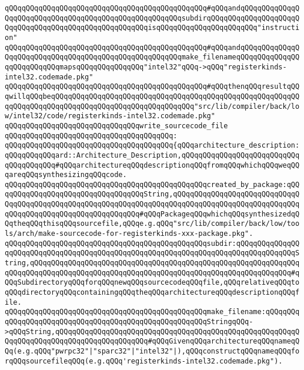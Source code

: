 \verb|qQQqqQQqqQQqqQQqqQQqqQQqqQQqqQQqqQQqqQQqqQQqqQQq#qQQqandqQQqqQQqqQQqqQQqqQQqqQQqqQQqqQQqqQQqqQQqqQQqqQQqqQQqqQQqsubdirqQQqqQQqqQQqqQQqqQQqqQQqqQQqqQQqqQQqqQQqqQQqqQQqqQQqqQQqisqQQqqQQqqQQqqQQqqQQqqQQq"instruction"|\newline
\verb|qQQqqQQqqQQqqQQqqQQqqQQqqQQqqQQqqQQqqQQqqQQqqQQq#qQQqandqQQqqQQqqQQqqQQqqQQqqQQqqQQqqQQqqQQqqQQqqQQqqQQqqQQqqQQqmake_filenameqQQqqQQqqQQqqQQqqQQqqQQqqQQqmapsqQQqqQQqqQQqqQQq"intel32"qQQq->qQQq"registerkinds-intel32.codemade.pkg"|\newline
\verb|qQQqqQQqqQQqqQQqqQQqqQQqqQQqqQQqqQQqqQQqqQQqqQQq#qQQqthenqQQqresultqQQqwillqQQqbeqQQqqQQqqQQqqQQqqQQqqQQqqQQqqQQqqQQqqQQqqQQqqQQqqQQqqQQqqQQqqQQqqQQqqQQqqQQqqQQqqQQqqQQqqQQqqQQqqQQqqQQq"src/lib/compiler/back/low/intel32/code/registerkinds-intel32.codemade.pkg"|\newline
\newline
\verb|qQQqqQQqqQQqqQQqqQQqqQQqqQQqqQQqwrite_sourcecode_file|\newline
\verb|qQQqqQQqqQQqqQQqqQQqqQQqqQQqqQQqqQQqqQQq:|\newline
\verb|qQQqqQQqqQQqqQQqqQQqqQQqqQQqqQQqqQQqqQQq{qQQqarchitecture_description:qQQqqQQqqQQqard::Architecture_Description,qQQqqQQqqQQqqQQqqQQqqQQqqQQqqQQqqQQqqQQq#qQQqarchitectureqQQqdescriptionqQQqfromqQQqwhichqQQqweqQQqareqQQqsynthesizingqQQqcode.|\newline
\verb|qQQqqQQqqQQqqQQqqQQqqQQqqQQqqQQqqQQqqQQqqQQqqQQqcreated_by_package:qQQqqQQqqQQqqQQqqQQqqQQqqQQqqQQqqQQqString,qQQqqQQqqQQqqQQqqQQqqQQqqQQqqQQqqQQqqQQqqQQqqQQqqQQqqQQqqQQqqQQqqQQqqQQqqQQqqQQqqQQqqQQqqQQqqQQqqQQqqQQqqQQqqQQqqQQqqQQqqQQqqQQqqQQq#qQQqPackageqQQqwhichqQQqsynthesizedqQQqtheqQQqthisqQQqsourcefile,qQQqe.g.qQQq"src/lib/compiler/back/low/tools/arch/make-sourcecode-for-registerkinds-xxx-package.pkg".|\newline
\verb|qQQqqQQqqQQqqQQqqQQqqQQqqQQqqQQqqQQqqQQqqQQqqQQqsubdir:qQQqqQQqqQQqqQQqqQQqqQQqqQQqqQQqqQQqqQQqqQQqqQQqqQQqqQQqqQQqqQQqqQQqqQQqqQQqqQQqqQQqString,qQQqqQQqqQQqqQQqqQQqqQQqqQQqqQQqqQQqqQQqqQQqqQQqqQQqqQQqqQQqqQQqqQQqqQQqqQQqqQQqqQQqqQQqqQQqqQQqqQQqqQQqqQQqqQQqqQQqqQQqqQQqqQQqqQQq#qQQqSubdirectoryqQQqforqQQqnewqQQqsourcecodeqQQqfile,qQQqrelativeqQQqtoqQQqdirectoryqQQqcontainingqQQqtheqQQqarchitectureqQQqdescriptionqQQqfile.|\newline
\verb|qQQqqQQqqQQqqQQqqQQqqQQqqQQqqQQqqQQqqQQqqQQqqQQqmake_filename:qQQqqQQqqQQqqQQqqQQqqQQqqQQqqQQqqQQqqQQqqQQqqQQqqQQqqQQqStringqQQq->qQQqString,qQQqqQQqqQQqqQQqqQQqqQQqqQQqqQQqqQQqqQQqqQQqqQQqqQQqqQQqqQQqqQQqqQQqqQQqqQQqqQQqqQQqqQQqqQQq#qQQqGivenqQQqarchitectureqQQqnameqQQq(e.g.qQQq"pwrpc32"|\verb#|"sparc32"|"intel32"|),qQQqconstructqQQqnameqQQqforqQQqsourcefileqQQq(e.g.qQQq'registerkinds-intel32.codemade.pkg").#\newline
